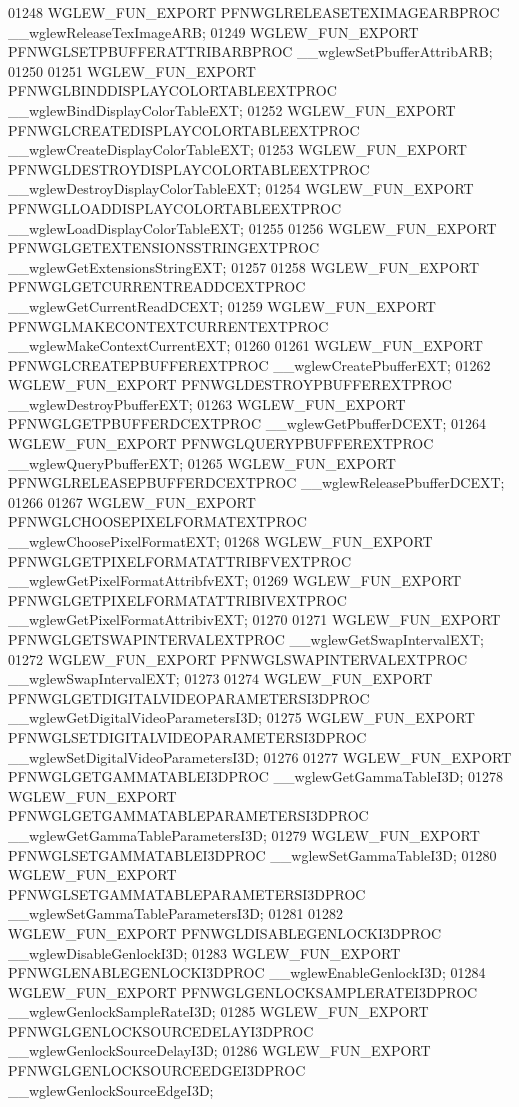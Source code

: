 \begin{DoxyCode}
01248 WGLEW_FUN_EXPORT PFNWGLRELEASETEXIMAGEARBPROC __wglewReleaseTexImageARB;
01249 WGLEW_FUN_EXPORT PFNWGLSETPBUFFERATTRIBARBPROC __wglewSetPbufferAttribARB;
01250 
01251 WGLEW_FUN_EXPORT PFNWGLBINDDISPLAYCOLORTABLEEXTPROC 
      __wglewBindDisplayColorTableEXT;
01252 WGLEW_FUN_EXPORT PFNWGLCREATEDISPLAYCOLORTABLEEXTPROC 
      __wglewCreateDisplayColorTableEXT;
01253 WGLEW_FUN_EXPORT PFNWGLDESTROYDISPLAYCOLORTABLEEXTPROC 
      __wglewDestroyDisplayColorTableEXT;
01254 WGLEW_FUN_EXPORT PFNWGLLOADDISPLAYCOLORTABLEEXTPROC 
      __wglewLoadDisplayColorTableEXT;
01255 
01256 WGLEW_FUN_EXPORT PFNWGLGETEXTENSIONSSTRINGEXTPROC __wglewGetExtensionsStringEXT;
01257 
01258 WGLEW_FUN_EXPORT PFNWGLGETCURRENTREADDCEXTPROC __wglewGetCurrentReadDCEXT;
01259 WGLEW_FUN_EXPORT PFNWGLMAKECONTEXTCURRENTEXTPROC __wglewMakeContextCurrentEXT;
01260 
01261 WGLEW_FUN_EXPORT PFNWGLCREATEPBUFFEREXTPROC __wglewCreatePbufferEXT;
01262 WGLEW_FUN_EXPORT PFNWGLDESTROYPBUFFEREXTPROC __wglewDestroyPbufferEXT;
01263 WGLEW_FUN_EXPORT PFNWGLGETPBUFFERDCEXTPROC __wglewGetPbufferDCEXT;
01264 WGLEW_FUN_EXPORT PFNWGLQUERYPBUFFEREXTPROC __wglewQueryPbufferEXT;
01265 WGLEW_FUN_EXPORT PFNWGLRELEASEPBUFFERDCEXTPROC __wglewReleasePbufferDCEXT;
01266 
01267 WGLEW_FUN_EXPORT PFNWGLCHOOSEPIXELFORMATEXTPROC __wglewChoosePixelFormatEXT;
01268 WGLEW_FUN_EXPORT PFNWGLGETPIXELFORMATATTRIBFVEXTPROC 
      __wglewGetPixelFormatAttribfvEXT;
01269 WGLEW_FUN_EXPORT PFNWGLGETPIXELFORMATATTRIBIVEXTPROC 
      __wglewGetPixelFormatAttribivEXT;
01270 
01271 WGLEW_FUN_EXPORT PFNWGLGETSWAPINTERVALEXTPROC __wglewGetSwapIntervalEXT;
01272 WGLEW_FUN_EXPORT PFNWGLSWAPINTERVALEXTPROC __wglewSwapIntervalEXT;
01273 
01274 WGLEW_FUN_EXPORT PFNWGLGETDIGITALVIDEOPARAMETERSI3DPROC 
      __wglewGetDigitalVideoParametersI3D;
01275 WGLEW_FUN_EXPORT PFNWGLSETDIGITALVIDEOPARAMETERSI3DPROC 
      __wglewSetDigitalVideoParametersI3D;
01276 
01277 WGLEW_FUN_EXPORT PFNWGLGETGAMMATABLEI3DPROC __wglewGetGammaTableI3D;
01278 WGLEW_FUN_EXPORT PFNWGLGETGAMMATABLEPARAMETERSI3DPROC 
      __wglewGetGammaTableParametersI3D;
01279 WGLEW_FUN_EXPORT PFNWGLSETGAMMATABLEI3DPROC __wglewSetGammaTableI3D;
01280 WGLEW_FUN_EXPORT PFNWGLSETGAMMATABLEPARAMETERSI3DPROC 
      __wglewSetGammaTableParametersI3D;
01281 
01282 WGLEW_FUN_EXPORT PFNWGLDISABLEGENLOCKI3DPROC __wglewDisableGenlockI3D;
01283 WGLEW_FUN_EXPORT PFNWGLENABLEGENLOCKI3DPROC __wglewEnableGenlockI3D;
01284 WGLEW_FUN_EXPORT PFNWGLGENLOCKSAMPLERATEI3DPROC __wglewGenlockSampleRateI3D;
01285 WGLEW_FUN_EXPORT PFNWGLGENLOCKSOURCEDELAYI3DPROC __wglewGenlockSourceDelayI3D;
01286 WGLEW_FUN_EXPORT PFNWGLGENLOCKSOURCEEDGEI3DPROC __wglewGenlockSourceEdgeI3D;

\end{DoxyCode}
